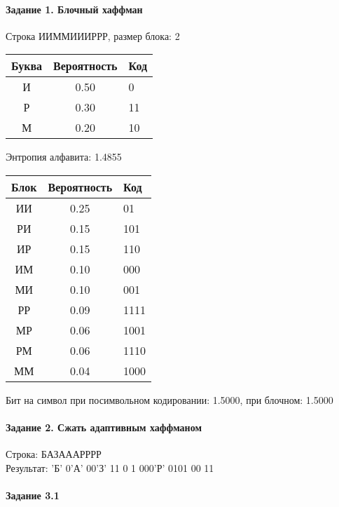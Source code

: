 \documentclass[a4paper, 12pt]{article}
\begin{document}
\paragraph{Задание 1. Блочный хаффман \\}

Строка ИИММИИИРРР, размер блока: 2
\begin{center}
 \begin{tabular}{ |c|c|l| } 
  \hline
     Буква & Вероятность & Код\\ \hline
И & 0.50 & 0\\\hline
Р & 0.30 & 11\\\hline
М & 0.20 & 10
\\ \hline \end{tabular}
\end{center}
Энтропия алфавита: 1.4855
\begin{center}
 \begin{tabular}{ |c|c|l| } 
  \hline
     Блок & Вероятность & Код\\ \hline
ИИ & 0.25 & 01\\\hline
РИ & 0.15 & 101\\\hline
ИР & 0.15 & 110\\\hline
ИМ & 0.10 & 000\\\hline
МИ & 0.10 & 001\\\hline
РР & 0.09 & 1111\\\hline
МР & 0.06 & 1001\\\hline
РМ & 0.06 & 1110\\\hline
ММ & 0.04 & 1000
\\ \hline \end{tabular}
\end{center}
Бит на символ при посимвольном кодировании: 1.5000, при блочном: 1.5000


\pagebreak
\paragraph{Задание 2. Сжать адаптивным хаффманом\\}

Строка: 
БАЗАААРРРР\\
Результат: 'Б' 0'А' 00'З' 11 0 1 000'Р' 0101 00 11










\pagebreak
\paragraph{Задание 3.1}
\end{document}
